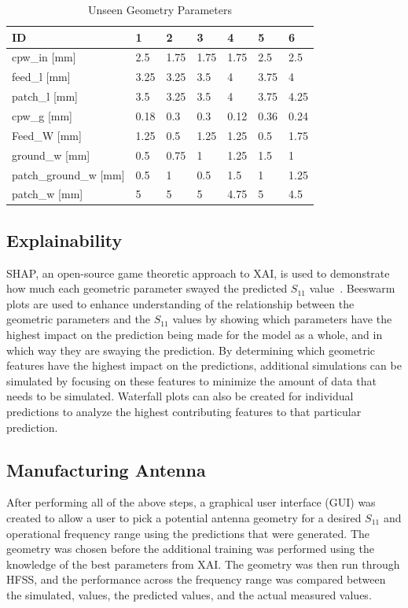 \documentclass[conference]{IEEEtran}
\begin{document}
\begin{table}[h]
\caption{Unseen Geometry Parameters}
\begin{center}
\begin{tabular}{ |l|l|l|l|l|l|l| }
    \hline
    ID & 1 & 2 & 3 & 4 & 5 & 6 \\
    \hline
    cpw\_in [mm] & 2.5 & 1.75 & 1.75 & 1.75 & 2.5 & 2.5 \\
    \hline
    feed\_l [mm] & 3.25 & 3.25 & 3.5 & 4 & 3.75 & 4 \\
    \hline
    patch\_l [mm] & 3.5 & 3.25 & 3.5 & 4 & 3.75 & 4.25 \\
    \hline
    cpw\_g [mm] & 0.18 & 0.3 & 0.3 & 0.12 & 0.36 & 0.24 \\
    \hline
    Feed\_W [mm] & 1.25 & 0.5 & 1.25 & 1.25 & 0.5 & 1.75 \\
    \hline
    ground\_w [mm] & 0.5 & 0.75 & 1 & 1.25 & 1.5 & 1 \\
    \hline
    patch\_ground\_w [mm] & 0.5 & 1 & 0.5 & 1.5 & 1 & 1.25 \\
    \hline
    patch\_w [mm] & 5 & 5 & 5 & 4.75 & 5 & 4.5 \\
    \hline
\end{tabular}
\end{center}
\label{unseen_geometries_lw}
\end{table}    
    



\subsection{Explainability}
SHAP, an open-source game theoretic approach to XAI, is used to demonstrate how much each geometric parameter swayed the predicted $S_{11}$ value~\cite{NIPS2017_7062}. Beeswarm plots are used to enhance understanding of the relationship between the geometric parameters and the $S_{11}$ values by showing which parameters have the highest impact on the prediction being made for the model as a whole, and in which way they are swaying the prediction. By determining which geometric features have the highest impact on the predictions, additional simulations can be simulated by focusing on these features to minimize the amount of data that needs to be simulated. Waterfall plots can also be created for individual predictions to analyze the highest contributing features to that particular prediction.

\subsection{Manufacturing Antenna}
After performing all of the above steps, a graphical user interface (GUI) was created to allow a user to pick a potential antenna geometry for a desired $S_{11}$ and operational frequency range using the predictions that were generated. The geometry was chosen before the additional training was performed using the knowledge of the best parameters from XAI. The geometry was then run through HFSS, and the performance across the frequency range was compared between the simulated, values, the predicted values, and the actual measured values. 
\end{document}
